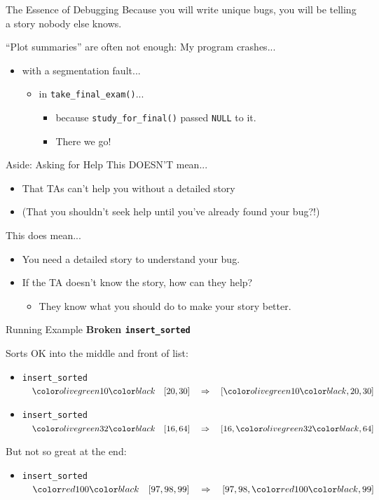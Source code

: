 \documentclass[xcolor=dvipsnames]{beamer}
\begin{document}
\begin{frame}{The Essence of Debugging}
	Because you will write unique bugs, you will be telling a story nobody else knows.

	\linegap
	``Plot summaries'' are often not enough: My program crashes...
	\pause
	\begin{itemize}
		\item with a segmentation fault...
		\pause
		\begin{itemize}
			\item in \texttt{take\_final\_exam()}...
			\pause
			\begin{itemize}
				\item because \texttt{study\_for\_final()} passed \texttt{NULL} to it.
				\item There we go!
			\end{itemize}
		\end{itemize}
	\end{itemize}
\end{frame}

\begin{frame}{Aside: Asking for Help}
	This DOESN'T mean...
	\begin{itemize}
		\item That TAs can't help you without a detailed story
		\item (That you shouldn't seek help until you've already found your bug?!)
	\end{itemize}
	\pause
	\linegap

	This does mean...
	\begin{itemize}
		\item You need a detailed story to understand your bug.
		\item If the TA doesn't know the story, how can they help?
		\pause
		\begin{itemize}
			\item They know what you should do to make your story better.
		\end{itemize}
	\end{itemize}
\end{frame}

\begin{frame}{Running Example}
	\textbf{Broken \texttt{insert\_sorted}}

	\linegap
	Sorts OK into the middle and front of list:
	\begin{itemize}
		\item \texttt{insert\_sorted} $\quad \hilight{olivegreen}{10} \quad  [20,30] \quad \Rightarrow \quad [\hilight{olivegreen}{10},20,30]$
		\item \texttt{insert\_sorted} $\quad \hilight{olivegreen}{32} \quad  [16,64] \quad \Rightarrow \quad [16,\hilight{olivegreen}{32},64]$
	\end{itemize}

	\linegap
	But not so great at the end:
	\begin{itemize}
	\item \texttt{insert\_sorted} $\quad \hilight{red}{100}  \quad [97,98,99] \quad \Rightarrow \quad [97,98,\hilight{red}{100},99]$
	\end{itemize}
\end{frame}
\end{document}
